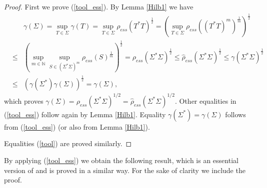 \documentclass[12pt, reqno]{amsart}
\theoremstyle{definition}
\theoremstyle{remark}
\numberwithin{equation}{section}
\newcommand{\NN}{\mathbb{N}}
\begin{document}
\begin{proof}
First we prove (\ref{tool_ess}). By Lemma \ref{Hilb1} we have
\begin{eqnarray}
\nonumber
& & \gamma (\Sigma)=\sup_{T\in \Sigma} \gamma (T)=\sup_{T\in \Sigma}\rho _{ess}(T^*T)^{\frac{1}{2}}=(\sup_{T \in \Sigma}\rho _{ess} ((T^*T)^m)^{\frac{1}{m}})^{\frac{1}{2}} \\
 &\le & \left (\sup _{m\in \NN}\sup_{S\in( \Sigma^* \Sigma)^m}\rho_{ess} (S)^{\frac{1}{m}}\right)^{\frac{1}{2}} 
\nonumber
=\rho  _{ess} ( \Sigma^* \Sigma)^{\frac{1}{2}}\le\hat{\rho}_{ess}( \Sigma^* \Sigma)^{\frac{1}{2}}\le \gamma ( \Sigma^* \Sigma )^{\frac{1}{2}}\\
&\le&(\gamma ( \Sigma^*) \gamma ( \Sigma))^{\frac{1}{2}}= \gamma ( \Sigma),
\nonumber
\end{eqnarray} 
which  proves  $\gamma (\Sigma )=\rho _{ess}(\Sigma^*\Sigma)^{1/2}=\hat{\rho} _{ess}(\Sigma^*\Sigma)^{1/2}$. Other equalities in (\ref{tool_ess}) follow again by Lemma \ref{Hilb1}. Equality $\gamma (\Sigma^*)= \gamma (\Sigma)$ follows from  (\ref{tool_ess}) (or also from Lemma \ref{Hilb1}). 

Equalities (\ref{tool}) are proved similarly.
\end{proof}
By applying (\ref{tool_ess}) we obtain the following result, which is an essential version of 
\cite[Theorem 3.2]{B23+} and is proved in a  similar way. For the sake of clarity we include the proof.
\end{document}

